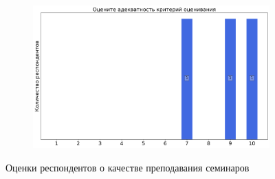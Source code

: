 \begin{figure}[H]
\begin{subfigure}[b]{0.45\textwidth}
			\end{subfigure}
			\begin{subfigure}[b]{0.45\textwidth}
				\centering
				\includegraphics[width=\textwidth]{images/2 course/Аналитическая механика/seminarists-marks-Маштаков Я.В.-3.png}
			\end{subfigure}	
			\caption{Оценки респондентов о качестве преподавания семинаров}
		\end{figure}


        
